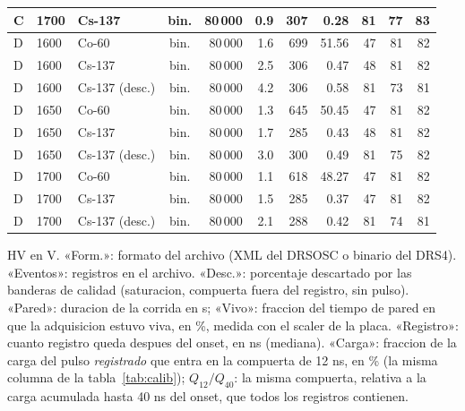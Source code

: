 \begin{longtable}{lllcrrrrrrr}
C & 1700 & Cs-137 & bin. & 80\,000 & 0.9 & 307 & 0.28 & 81 & 77 & 83 \\
\midrule
D & 1600 & Co-60 & bin. & 80\,000 & 1.6 & 699 & 51.56 & 47 & 81 & 82 \\
D & 1600 & Cs-137 & bin. & 80\,000 & 2.5 & 306 & 0.47 & 48 & 81 & 82 \\
D & 1600 & Cs-137 (desc.) & bin. & 80\,000 & 4.2 & 306 & 0.58 & 81 & 73 & 81 \\
D & 1650 & Co-60 & bin. & 80\,000 & 1.3 & 645 & 50.45 & 47 & 81 & 82 \\
D & 1650 & Cs-137 & bin. & 80\,000 & 1.7 & 285 & 0.43 & 48 & 81 & 82 \\
D & 1650 & Cs-137 (desc.) & bin. & 80\,000 & 3.0 & 300 & 0.49 & 81 & 75 & 82 \\
D & 1700 & Co-60 & bin. & 80\,000 & 1.1 & 618 & 48.27 & 47 & 81 & 82 \\
D & 1700 & Cs-137 & bin. & 80\,000 & 1.5 & 285 & 0.37 & 47 & 81 & 82 \\
D & 1700 & Cs-137 (desc.) & bin. & 80\,000 & 2.1 & 288 & 0.42 & 81 & 74 & 81 \\
\bottomrule
\end{longtable}
\par\smallskip
\begin{minipage}{0.95\linewidth}\footnotesize HV en V. «Form.»: formato del archivo (XML del DRSOSC o binario del DRS4). «Eventos»: registros en el archivo. «Desc.»: porcentaje descartado por las banderas de calidad (saturacion, compuerta fuera del registro, sin pulso). «Pared»: duracion de la corrida en s; «Vivo»: fraccion del tiempo de pared en que la adquisicion estuvo viva, en \%, medida con el scaler de la placa. «Registro»: cuanto registro queda despues del onset, en ns (mediana). «Carga»: fraccion de la carga del pulso \emph{registrado} que entra en la compuerta de 12 ns, en \% (la misma columna de la tabla~\ref{tab:calib}); $Q_{12}/Q_{40}$: la misma compuerta, relativa a la carga acumulada hasta 40 ns del onset, que todos los registros contienen.\end{minipage}
